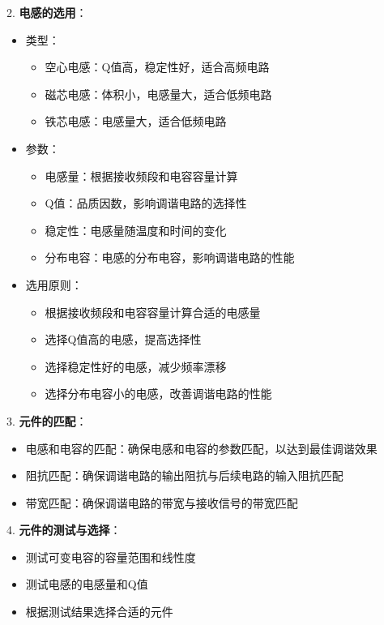 \documentclass[12pt,UTF8]{ctexbook}
\begin{document}
2. \textbf{电感的选用}：
   \begin{itemize}[leftmargin=3.5em]
   \item 类型：
     \begin{itemize}
     \item 空心电感：Q值高，稳定性好，适合高频电路
     \item 磁芯电感：体积小，电感量大，适合低频电路
     \item 铁芯电感：电感量大，适合低频电路
     \end{itemize}
   \item 参数：
     \begin{itemize}
     \item 电感量：根据接收频段和电容容量计算
     \item Q值：品质因数，影响调谐电路的选择性
     \item 稳定性：电感量随温度和时间的变化
     \item 分布电容：电感的分布电容，影响调谐电路的性能
     \end{itemize}
   \item 选用原则：
     \begin{itemize}
     \item 根据接收频段和电容容量计算合适的电感量
     \item 选择Q值高的电感，提高选择性
     \item 选择稳定性好的电感，减少频率漂移
     \item 选择分布电容小的电感，改善调谐电路的性能
     \end{itemize}
   \end{itemize}

3. \textbf{元件的匹配}：
   \begin{itemize}[leftmargin=3.5em]
   \item 电感和电容的匹配：确保电感和电容的参数匹配，以达到最佳调谐效果
   \item 阻抗匹配：确保调谐电路的输出阻抗与后续电路的输入阻抗匹配
   \item 带宽匹配：确保调谐电路的带宽与接收信号的带宽匹配
   \end{itemize}

4. \textbf{元件的测试与选择}：
   \begin{itemize}[leftmargin=3.5em]
   \item 测试可变电容的容量范围和线性度
   \item 测试电感的电感量和Q值
   \item 根据测试结果选择合适的元件
   \end{itemize}
\end{document}
